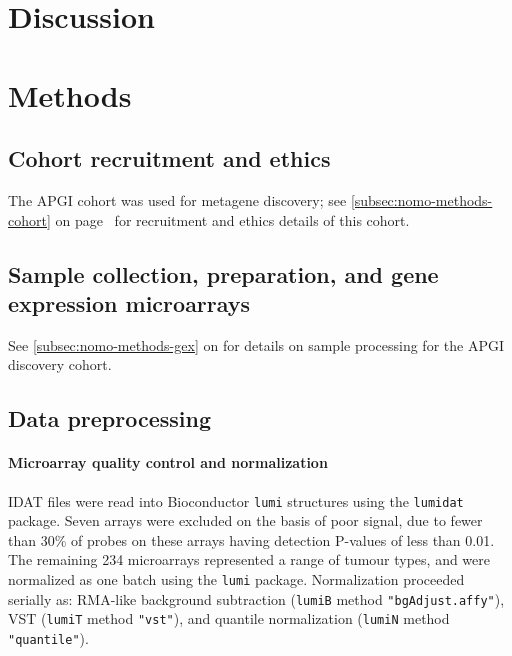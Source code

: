 \documentclass[dissertation.tex]{subfiles}
\begin{document}
\section{Discussion}

\section{Methods}
\subsection{Cohort recruitment and ethics}
The \gls{APGI} cohort was used for metagene discovery; see \cref{subsec:nomo-methods-cohort} on page~\pageref{subsec:nomo-methods-cohort} for recruitment and ethics details of this cohort.

\subsection{Sample collection, preparation, and gene expression microarrays}
See \cref{subsec:nomo-methods-gex} on  for details on sample processing for the \gls{APGI} discovery cohort.

\subsection{Data preprocessing}
\paragraph{Microarray quality control and normalization}
\gls{IDAT} files were read into Bioconductor \texttt{lumi} structures using the \texttt{lumidat} package.  Seven arrays were excluded on the basis of poor signal, due to fewer than 30\% of probes on these arrays having detection P-values of less than 0.01.  The remaining 234 microarrays represented a range of tumour types, and were normalized as one batch using the \texttt{lumi} package.  Normalization proceeded serially as: RMA-like background subtraction (\texttt{lumiB} method \texttt{"bgAdjust.affy"}), \gls{VST} (\texttt{lumiT} method \texttt{"vst"}), and quantile normalization (\texttt{lumiN} method \texttt{"quantile"}).
\end{document}
